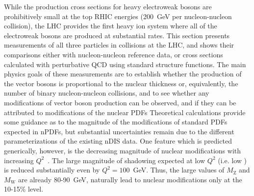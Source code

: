 
While the production cross sections for heavy electroweak bosons are prohibitively small at the
top RHIC energies (200~GeV per nucleon-nucleon collision), the LHC provides the first
heavy ion system where all of the electroweak bosons are produced at substantial rates.
This section presents measurements of all three particles in \PbPb collisions at the LHC,
and shows their comparisons either with nucleon-nucleon reference data, or cross sections
calculated with perturbative QCD using standard structure functions.
The main physics goals of these measurements are 
to establish whether the production of the vector bosons is proportional to the
nuclear thickness or, equivalently, the number of binary nucleon-nucleon collisions,
and to see whether any modifications of vector boson production can be observed,
and if they can be attributed to modifications of the nuclear PDFs
Theoretical calculations provide some guidance as to the magnitude of the modifications
of standard PDFs expected in nPDFs, but substantial uncertainties remain due to the
different parameterizations of the existing nDIS data.
One feature which is predicted generically, however, is the decreasing magnitude of
nuclear modifications with increasing $Q^2$~\cite{Salgado:2011wc}.  
The large magnitude
of shadowing expected at low $Q^2$ (i.e. low \pT) is reduced substantially even by
$Q^2=100$~GeV.  
Thus, the large values of $M_{\mathrm Z}$ and $M_{\mathrm W}$ are already 80-90~GeV, 
naturally lead to nuclear modifications only at the 10-15\% level.


